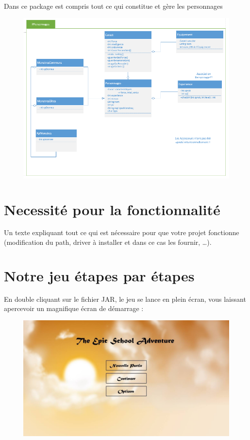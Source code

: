 \documentclass[a4paper,titlepage]{article}
\begin{document}
	Dans ce package est compris tout ce qui constitue et gère les personnages
	\begin{figure}[h!]
		\includegraphics[scale=0.70]{PPersonnage.png}
	\end{figure}
	\clearpage
	
	\section{Necessité pour la fonctionnalité}
	Un texte expliquant tout ce qui est nécessaire pour que votre projet fonctionne (modification du path, driver à installer et dans ce cas les fournir, …).
	\clearpage
	
	\section{Notre jeu étapes par étapes}
	En double cliquant sur le fichier JAR, le jeu se lance en plein écran, vous laissant apercevoir un magnifique écran de démarrage :
	\begin{figure}[h!]
		\includegraphics[scale=0.30]{EcranDebut.jpg}
	\end{figure}
	
\end{document}
